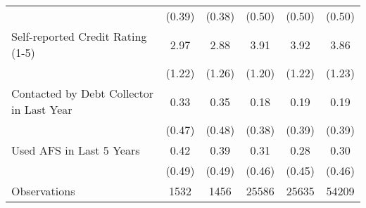 {\begin{tabular}{l*{5}{c}}
                    &      (0.39)&      (0.38)&      (0.50)&      (0.50)&      (0.50)\\
Self-reported Credit Rating (1-5)&        2.97&        2.88&        3.91&        3.92&        3.86\\
                    &      (1.22)&      (1.26)&      (1.20)&      (1.22)&      (1.23)\\
Contacted by Debt Collector in Last Year&        0.33&        0.35&        0.18&        0.19&        0.19\\
                    &      (0.47)&      (0.48)&      (0.38)&      (0.39)&      (0.39)\\
Used AFS in Last 5 Years&        0.42&        0.39&        0.31&        0.28&        0.30\\
                    &      (0.49)&      (0.49)&      (0.46)&      (0.45)&      (0.46)\\
Observations                  &        1532&        1456&       25586&       25635&       54209\\
\hline\hline
\end{tabular}
}
